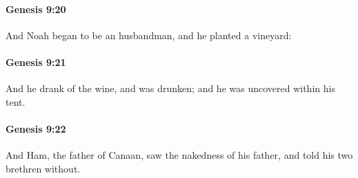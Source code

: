 		\paragraph{Genesis 9:20} %
			\label{GENESIS-9-20}

			And Noah began to be an husbandman, and he planted a vineyard:


		\paragraph{Genesis 9:21} %
			\label{GENESIS-9-21}

			And he drank of the wine, and was drunken; and he was uncovered within his tent.


		\paragraph{Genesis 9:22} %
			\label{GENESIS-9-22}

			And Ham, the father of Canaan, saw the nakedness of his father, and told his two brethren without.


